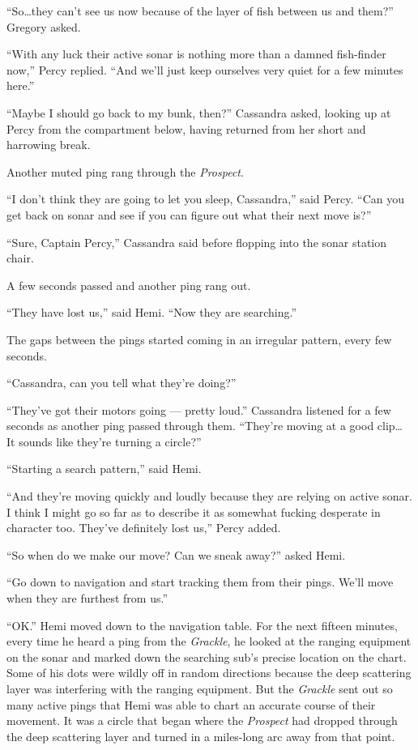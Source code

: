 \documentclass[
]{scrbook}
\begin{document}
``So\ldots they can't see us now because of the layer of fish between us
and them?'' Gregory asked.

``With any luck their active sonar is nothing more than a damned
fish-finder now,'' Percy replied. ``And we'll just keep ourselves very
quiet for a few minutes here.''

``Maybe I should go back to my bunk, then?'' Cassandra asked, looking up
at Percy from the compartment below, having returned from her short and
harrowing break.

Another muted ping rang through the \emph{Prospect}.

``I don't think they are going to let you sleep, Cassandra,'' said
Percy. ``Can you get back on sonar and see if you can figure out what
their next move is?''

``Sure, Captain Percy,'' Cassandra said before flopping into the sonar
station chair.

A few seconds passed and another ping rang out.

``They have lost us,'' said Hemi. ``Now they are searching.''

The gaps between the pings started coming in an irregular pattern, every
few seconds.

``Cassandra, can you tell what they're doing?''

``They've got their motors going --- pretty loud.'' Cassandra listened
for a few seconds as another ping passed through them. ``They're moving
at a good clip\ldots{} It sounds like they're turning a circle?''

``Starting a search pattern,'' said Hemi.

``And they're moving quickly and loudly because they are relying on
active sonar. I think I might go so far as to describe it as somewhat
fucking desperate in character too. They've definitely lost us,'' Percy
added.

``So when do we make our move? Can we sneak away?'' asked Hemi.

``Go down to navigation and start tracking them from their pings. We'll
move when they are furthest from us.''

``OK.'' Hemi moved down to the navigation table. For the next fifteen
minutes, every time he heard a ping from the \emph{Grackle}, he looked
at the ranging equipment on the sonar and marked down the searching
sub's precise location on the chart. Some of his dots were wildly off in
random directions because the deep scattering layer was interfering with
the ranging equipment. But the \emph{Grackle} sent out so many active
pings that Hemi was able to chart an accurate course of their movement.
It was a circle that began where the \emph{Prospect} had dropped through
the deep scattering layer and turned in a miles-long arc away from that
point.
\end{document}
